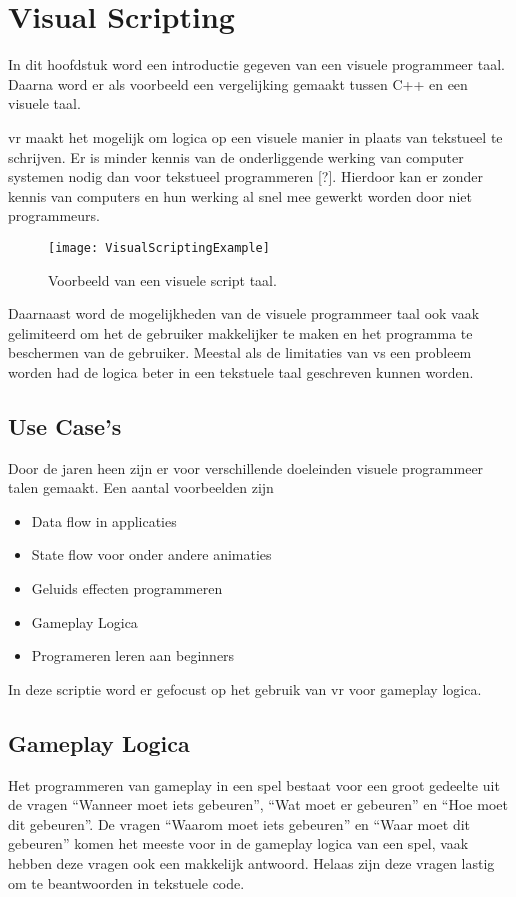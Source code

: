 \lstset {language=C++}

\chapter{Visual Scripting}
In dit hoofdstuk word een introductie gegeven van een visuele programmeer taal. Daarna word er als voorbeeld een vergelijking gemaakt tussen C++ en een visuele taal.

\gls{vr} maakt het mogelijk om logica op een visuele manier in plaats van tekstueel te schrijven. Er is minder kennis van de onderliggende werking van computer systemen nodig dan voor tekstueel programmeren [?]. Hierdoor kan er zonder kennis van computers en hun werking al snel mee gewerkt worden door niet programmeurs. 

\begin{figure}[!ht]
  \centering
    \texttt{[image: VisualScriptingExample]}
    \caption{Voorbeeld van een visuele script taal.}
\end{figure}

Daarnaast word de mogelijkheden van de visuele programmeer taal ook vaak gelimiteerd om het de gebruiker makkelijker te maken en het programma te beschermen van de gebruiker. Meestal als de limitaties van \gls{vs} een probleem worden had de logica beter in een tekstuele taal geschreven kunnen worden.

\section{Use Case's}
Door de jaren heen zijn er voor verschillende doeleinden visuele programmeer talen gemaakt. 
Een aantal voorbeelden zijn

\begin{itemize}  
\item Data flow in applicaties 
\item State flow voor onder andere animaties 
\item Geluids effecten programmeren
\item Gameplay Logica 
\item Programeren leren aan beginners 
\end{itemize}

In deze scriptie word er gefocust op het gebruik van \gls{vr} voor gameplay logica.

\section{Gameplay Logica}
Het programmeren van gameplay in een spel bestaat voor een groot gedeelte uit de vragen “Wanneer moet iets gebeuren”, “Wat moet er gebeuren” en “Hoe moet dit gebeuren”.
De vragen “Waarom moet iets gebeuren” en “Waar moet dit gebeuren” komen het meeste voor in de gameplay logica van een spel, vaak hebben deze vragen ook een makkelijk antwoord. Helaas zijn deze vragen lastig om te beantwoorden in tekstuele code.

